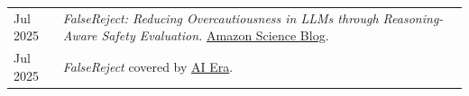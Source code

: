 \begin{longtable}[l]{@{}>{\raggedright\arraybackslash}p{} p{}@{}}
    Jul 2025 & \textit{FalseReject: Reducing Overcautiousness in LLMs through Reasoning-Aware Safety Evaluation.} \href{https://www.amazon.science/blog/falsereject-reducing-overcautiousness-in-llms-through-reasoning-aware-safety-evaluation}{Amazon Science Blog}. \\[0.5em]
    Jul 2025 & \textit{FalseReject} covered by \href{https://mp.weixin.qq.com/s/jQrZdGXlP0xYlGfO95hoIA}{AI Era}.
\end{longtable}
